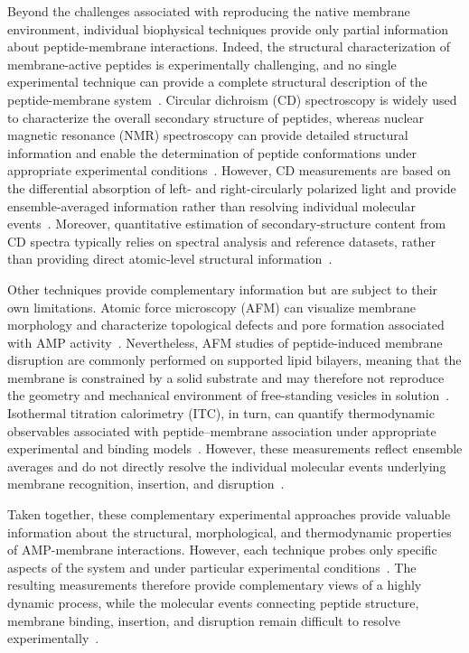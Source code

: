 Beyond the challenges associated with reproducing the native membrane environment, individual biophysical techniques provide only partial information about peptide-membrane interactions. Indeed, the structural characterization of membrane-active peptides is experimentally challenging, and no single experimental technique can provide a complete structural description of the peptide-membrane system~\cite{general_1}. Circular dichroism (CD) spectroscopy is widely used to characterize the overall secondary structure of peptides, whereas nuclear magnetic resonance (NMR) spectroscopy can provide detailed structural information and enable the determination of peptide conformations under appropriate experimental conditions~\cite{cd_1,cd_2,nmr_1,nmr_2}. However, CD measurements are based on the differential absorption of left- and right-circularly polarized light and provide ensemble-averaged information rather than resolving individual molecular events~\cite{cd_4,cd_3}. Moreover, quantitative estimation of secondary-structure content from CD spectra typically relies on spectral analysis and reference datasets, rather than providing direct atomic-level structural information~\cite{cd_3}.

Other techniques provide complementary information but are subject to their own limitations. Atomic force microscopy (AFM) can visualize membrane morphology and characterize topological defects and pore formation associated with AMP activity~\cite{afm_1,afm_2}. Nevertheless, AFM studies of peptide-induced membrane disruption are commonly performed on supported lipid bilayers, meaning that the membrane is constrained by a solid substrate and may therefore not reproduce the geometry and mechanical environment of free-standing vesicles in solution~\cite{afm_6}. Isothermal titration calorimetry (ITC), in turn, can quantify thermodynamic observables associated with peptide--membrane association under appropriate experimental and binding models~\cite{afm_4}. However, these measurements reflect ensemble averages and do not directly resolve the individual molecular events underlying membrane recognition, insertion, and disruption~\cite{afm_4}.

Taken together, these complementary experimental approaches provide valuable information about the structural, morphological, and thermodynamic properties of AMP-membrane interactions. However, each technique probes only specific aspects of the system and under particular experimental conditions~\cite{general_1}. The resulting measurements therefore provide complementary views of a highly dynamic process, while the molecular events connecting peptide structure, membrane binding, insertion, and disruption remain difficult to resolve experimentally~\cite{afm_1,afm_2,cd_3}.

